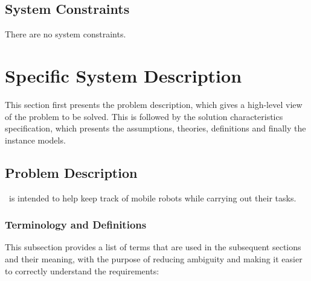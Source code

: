 \documentclass[12pt]{article}
\begin{document}
\subsection{System Constraints}

There are no system constraints.

\section{Specific System Description}

This section first presents the problem description, which gives a high-level
view of the problem to be solved.  This is followed by the solution characteristics
specification, which presents the assumptions, theories, definitions and finally
the instance models.

\subsection{Problem Description}\label{Sec_pd}

\progname~is intended to help keep track of mobile robots while carrying out their tasks.

\subsubsection{Terminology and  Definitions}

This subsection provides a list of terms that are used in the subsequent
sections and their meaning, with the purpose of reducing ambiguity and making it
easier to correctly understand the requirements:
\end{document}
